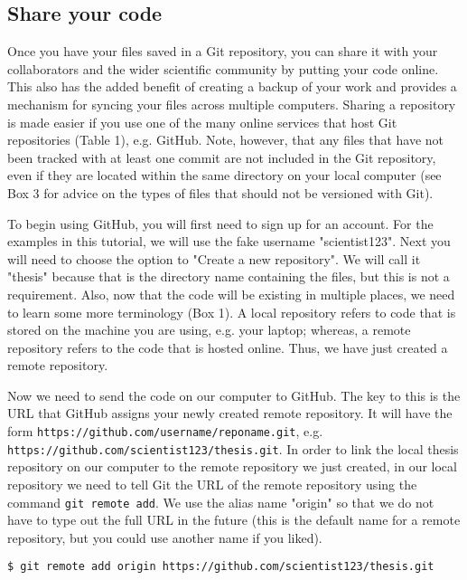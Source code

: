 \subsection{Share your code}

Once you have your files saved in a Git repository, you can share it with your collaborators and the wider scientific community by putting your code online.
This also has the added benefit of creating a backup of your work and provides a mechanism for syncing your files across multiple computers.
Sharing a repository is made easier if you use one of the many online services that host Git repositories (Table 1), e.g. GitHub.
Note, however, that any files that have not been tracked with at least one commit are not included in the Git repository, even if they are located within the same directory on your local computer (see Box 3 for advice on the types of files that should not be versioned with Git).

To begin using GitHub, you will first need to sign up for an account.
For the examples in this tutorial, we will use the fake username "scientist123".
Next you will need to choose the option to "Create a new repository".
We will call it "thesis" because that is the directory name containing the files, but this is not a requirement.
Also, now that the code will be existing in multiple places, we need to learn some more terminology (Box 1).
A local repository refers to code that is stored on the machine you are using, e.g. your laptop; whereas, a remote repository refers to the code that is hosted online.
Thus, we have just created a remote repository.

Now we need to send the code on our computer to GitHub.
The key to this is the URL that GitHub assigns your newly created remote repository.
It will have the form \verb|https://github.com/username/reponame.git|, e.g. \verb|https://github.com/scientist123/thesis.git|.
In order to link the local thesis repository on our computer to the remote repository we just created, in our local repository we need to tell Git the URL of the remote repository using the command \verb|git remote add|.
We use the alias name "origin" so that we do not have to type out the full URL in the future (this is the default name for a remote repository, but you could use another name if you liked).

\begin{lstlisting}
$ git remote add origin https://github.com/scientist123/thesis.git
\end{lstlisting}

